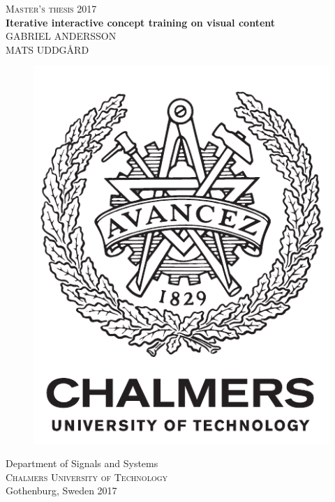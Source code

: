\newpage
\restoregeometry
\thispagestyle{empty}
\mbox{}


\newpage
\thispagestyle{empty}
\begin{center}
	\textsc{\large Master's thesis 2017}\\[4cm]		%
	\textbf{\Large Iterative interactive concept training on visual content} \\[1cm]
	{\large GABRIEL ANDERSSON} \\
	{\large MATS UDDGÅRD}
	
	\vfill	
	\begin{figure}[H]
	\centering
	\includegraphics[width=0.2\pdfpagewidth]{figure/auxiliary/logo_eng.pdf} \\	
	\end{figure}	\vspace{5mm}	
	
	Department of Signals and Systems \\
	\textsc{Chalmers University of Technology} \\
	Gothenburg, Sweden 2017 \\
\end{center}


